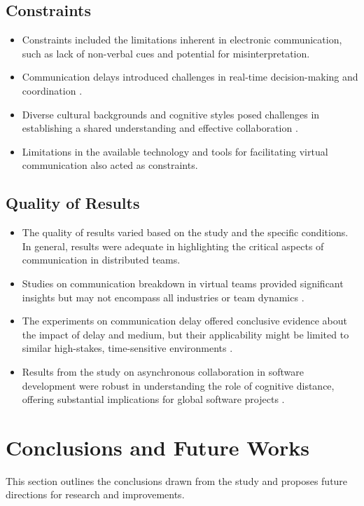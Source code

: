 \documentclass[12pt]{article}
\begin{document}
\subsection{Constraints}
\begin{itemize}
  \item Constraints included the limitations inherent in electronic communication, such as lack of non-verbal cues and potential for misinterpretation.
  \item Communication delays introduced challenges in real-time decision-making and coordination \cite{ref2}.
  \item Diverse cultural backgrounds and cognitive styles posed challenges in establishing a shared understanding and effective collaboration \cite{ref1, ref3}.
  \item Limitations in the available technology and tools for facilitating virtual communication also acted as constraints.
\end{itemize}

\subsection{Quality of Results}
\begin{itemize}
  \item The quality of results varied based on the study and the specific conditions. In general, results were adequate in highlighting the critical aspects of communication in distributed teams.
  \item Studies on communication breakdown in virtual teams provided significant insights but may not encompass all industries or team dynamics \cite{ref1}.
  \item The experiments on communication delay offered conclusive evidence about the impact of delay and medium, but their applicability might be limited to similar high-stakes, time-sensitive environments \cite{ref2}.
  \item Results from the study on asynchronous collaboration in software development were robust in understanding the role of cognitive distance, offering substantial implications for global software projects \cite{ref3}.
\end{itemize}

\section{Conclusions and Future Works}

This section outlines the conclusions drawn from the study and proposes future directions for research and improvements.
\end{document}
